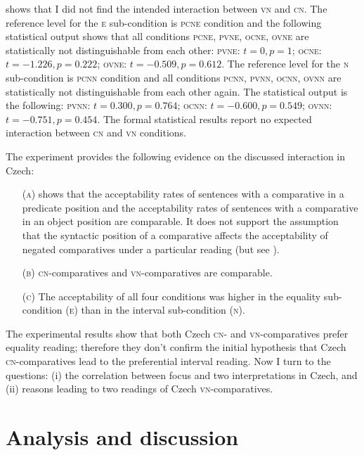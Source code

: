 \documentclass[output=paper,
]{langscibook}
\begin{document}
 shows that I did not find the intended interaction between \textsc{vn} and \textsc{cn}. The reference level for the \textsc{e} sub-condition is \textsc{pcne} condition and the following statistical output shows that all conditions \textsc{pcne, pvne, ocne, ovne} are statistically not distinguishable from each other: \textsc{pvne:} $t= 0, p = 1$; \textsc{ocne:} $t=-1.226,p = 0.222$; \textsc{ovne:} $t = -0.509, p = 0.612$. The reference level for the \textsc{n} sub-condition is \textsc{pcnn} condition and all conditions \textsc{pcnn, pvnn, ocnn, ovnn} are statistically not distinguishable from each other again. The statistical output is the following: \textsc{pvnn:} $t = 0.300, p = 0.764$; \textsc{ocnn:} $t = -0.600, p = 0.549$; \textsc{ovnn:} $t = -0.751, p = 0.454$. The formal statistical results report no expected interaction between \textsc{cn} and \textsc{vn} conditions.

The experiment provides the following evidence on the discussed interaction in Czech:

\begin{itemize}
\item[(\textsc{a})]  shows that the acceptability rates of sentences with a comparative in a predicate position and the acceptability rates of sentences with a comparative in an object position are comparable. It does not support the assumption that the syntactic position of a comparative affects the acceptability of negated comparatives under a particular reading
(but see \citealt{kadmon2001formal}).

\item[(\textsc{b})] \textsc{cn-}comparatives and \textsc{vn-}comparatives are comparable.

\item[(\textsc{c})] The acceptability of all four conditions was higher in the equality sub-condition (\textsc{e}) than in the interval sub-condition (\textsc{n}).
\end{itemize}

\noindent The experimental results show that both Czech \textsc{cn-} and \textsc{vn-}comparatives prefer equality reading; therefore they don't confirm the initial hypothesis that Czech \textsc{cn-}comparati\-ves lead to the preferential interval reading. Now I turn to the questions: (i) the correlation between focus and two interpretations in Czech, and (ii) reasons leading to two readings of Czech \textsc{vn-}comparatives.


\section{Analysis and discussion}
\end{document}
